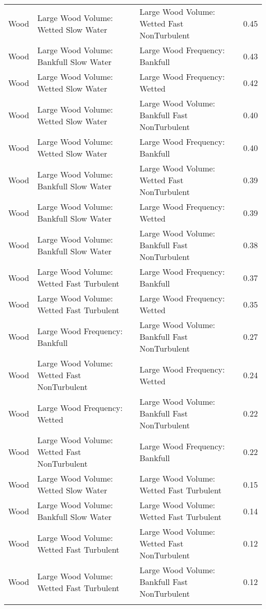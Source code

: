 \documentclass[
  12pt,
]{article}
\begin{document}
\begin{longtable}[t]{>{\raggedright\arraybackslash}p{1in}>{\raggedright\arraybackslash}p{2in}>{\raggedright\arraybackslash}p{2in}r}
Wood & Large Wood Volume: Wetted Slow Water & Large Wood Volume: Wetted Fast NonTurbulent & 0.45\\
Wood & Large Wood Volume: Bankfull Slow Water & Large Wood Frequency: Bankfull & 0.43\\
\addlinespace
Wood & Large Wood Volume: Wetted Slow Water & Large Wood Frequency: Wetted & 0.42\\
Wood & Large Wood Volume: Wetted Slow Water & Large Wood Volume: Bankfull Fast NonTurbulent & 0.40\\
Wood & Large Wood Volume: Wetted Slow Water & Large Wood Frequency: Bankfull & 0.40\\
Wood & Large Wood Volume: Bankfull Slow Water & Large Wood Volume: Wetted Fast NonTurbulent & 0.39\\
Wood & Large Wood Volume: Bankfull Slow Water & Large Wood Frequency: Wetted & 0.39\\
\addlinespace
Wood & Large Wood Volume: Bankfull Slow Water & Large Wood Volume: Bankfull Fast NonTurbulent & 0.38\\
Wood & Large Wood Volume: Wetted Fast Turbulent & Large Wood Frequency: Bankfull & 0.37\\
Wood & Large Wood Volume: Wetted Fast Turbulent & Large Wood Frequency: Wetted & 0.35\\
Wood & Large Wood Frequency: Bankfull & Large Wood Volume: Bankfull Fast NonTurbulent & 0.27\\
Wood & Large Wood Volume: Wetted Fast NonTurbulent & Large Wood Frequency: Wetted & 0.24\\
\addlinespace
Wood & Large Wood Frequency: Wetted & Large Wood Volume: Bankfull Fast NonTurbulent & 0.22\\
Wood & Large Wood Volume: Wetted Fast NonTurbulent & Large Wood Frequency: Bankfull & 0.22\\
Wood & Large Wood Volume: Wetted Slow Water & Large Wood Volume: Wetted Fast Turbulent & 0.15\\
Wood & Large Wood Volume: Bankfull Slow Water & Large Wood Volume: Wetted Fast Turbulent & 0.14\\
Wood & Large Wood Volume: Wetted Fast Turbulent & Large Wood Volume: Wetted Fast NonTurbulent & 0.12\\
\addlinespace
Wood & Large Wood Volume: Wetted Fast Turbulent & Large Wood Volume: Bankfull Fast NonTurbulent & 0.12\\*
\end{longtable}
\endgroup{}

\newpage
\end{document}
